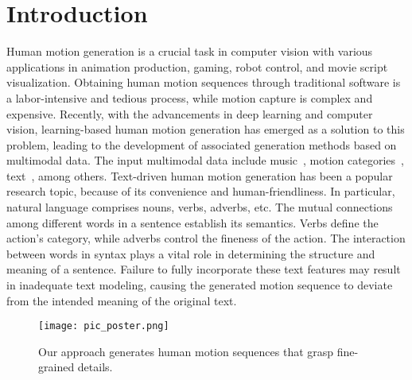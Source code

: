 \documentclass[10pt,twocolumn,letterpaper]{article}
\begin{document}
\section{Introduction}

Human motion generation is a crucial task in computer vision with various applications in animation production, gaming, robot control, and movie script visualization. Obtaining human motion sequences through traditional software is a labor-intensive and tedious process, while motion capture is complex and expensive. Recently, with the advancements in deep learning and computer vision, learning-based human motion generation has emerged as a solution to this problem, leading to the development of associated generation methods based on multimodal data. The input multimodal data include music~\cite{kao2020temporally,li2021ai,ren2020self,starke2022deepphase}, motion categories~\cite{cervantes2022implicit,guo2020action2motion,petrovich2021action}, text~\cite{ahuja2019language2pose,bhattacharya2021text2gestures,ghosh2021synthesis,guo2022generating,guo2022tm2t,lin:vigil18,petrovich2022temos,plappert2018learning,tevet2022human,zhang2022motiondiffuse}, among others. Text-driven human motion generation has been a popular research topic, because of its convenience and human-friendliness. In particular, natural language comprises nouns, verbs, adverbs, etc. 
The mutual connections among different words in a sentence establish its semantics. Verbs define the action's category, while adverbs control the fineness of the action.
The interaction between words in syntax plays a vital role in determining the structure and meaning of a sentence. Failure to fully incorporate these text features may result in inadequate text modeling, causing the generated motion sequence to deviate from the intended meaning of the original text.
\begin{figure}[t]
  \centering
  \texttt{[image: pic\_poster.png]}
  \caption{Our approach generates human motion sequences that grasp fine-grained details.}
\label{fig:fpic}
\end{figure}
\end{document}
